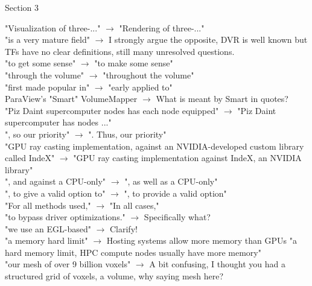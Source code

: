 \documentclass[]{article}
\begin{document}
Section 3

"Visualization of three-..." $\rightarrow$ "Rendering of three-..." \\

"is a very mature field" $\rightarrow$ I strongly argue the opposite, DVR is well known but TFs have no clear definitions, still many unresolved questions.\\

"to get some sense" $\rightarrow$ "to make some sense"\\

"through the volume" $\rightarrow$ "throughout the volume"\\

"first made popular in" $\rightarrow$ "early applied to"\\

ParaView's "Smart" VolumeMapper $\rightarrow$ What is meant by Smart in quotes?\\

"Piz Daint supercomputer nodes has each node equipped" $\rightarrow$ "Piz Daint supercomputer has nodes ..."\\

", so our priority" $\rightarrow$ ". Thus, our priority"\\

"GPU ray casting implementation, against an NVIDIA-developed custom library called IndeX" $\rightarrow$ "GPU ray casting implementation against IndeX, an NVIDIA library"\\

", and against a CPU-only" $\rightarrow$ ", as well as a CPU-only"\\

", to give a valid option to" $\rightarrow$ ", to provide a valid option"\\

"For all methods used," $\rightarrow$ "In all cases,"\\

"to bypass driver optimizations." $\rightarrow$ Specifically what?\\

"we use an EGL-based" $\rightarrow$ Clarify!\\

"a memory hard limit" $\rightarrow$ Hosting systems allow more memory than GPUs "a hard memory limit, HPC compute nodes usually have more memory"\\

"our mesh of over 9 billion voxels" $\rightarrow$ A bit confusing, I thought you had a structured grid of voxels, a volume, why saying mesh here?\\
\end{document}
